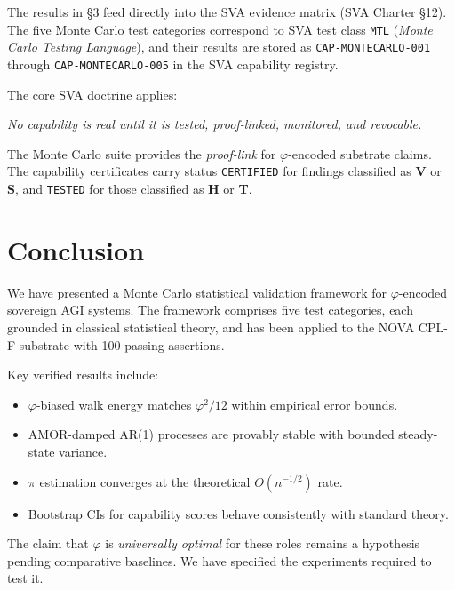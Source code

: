 \documentclass[11pt,a4paper]{article}
\begin{document}
The results in §3 feed directly into the SVA evidence matrix (SVA Charter §12).  The
five Monte Carlo test categories correspond to SVA test class \texttt{MTL}
(\emph{Monte Carlo Testing Language}), and their results are stored as
\texttt{CAP-MONTECARLO-001} through \texttt{CAP-MONTECARLO-005} in the SVA capability
registry.

The core SVA doctrine applies:

\begin{center}
\emph{No capability is real until it is tested, proof-linked, monitored, and revocable.}
\end{center}

The Monte Carlo suite provides the \emph{proof-link} for $\varphi$-encoded substrate
claims.  The capability certificates carry status \texttt{CERTIFIED} for findings
classified as \textbf{V} or \textbf{S}, and \texttt{TESTED} for those classified as
\textbf{H} or \textbf{T}.

\section{Conclusion}
\label{sec:conclusion}

We have presented a Monte Carlo statistical validation framework for $\varphi$-encoded
sovereign AGI systems.  The framework comprises five test categories, each grounded in
classical statistical theory, and has been applied to the NOVA CPL-F substrate with 100
passing assertions.

Key verified results include:
\begin{itemize}
  \item $\varphi$-biased walk energy matches $\varphi^2/12$ within empirical error bounds.
  \item AMOR-damped AR(1) processes are provably stable with bounded steady-state variance.
  \item $\pi$ estimation converges at the theoretical $O(n^{-1/2})$ rate.
  \item Bootstrap CIs for capability scores behave consistently with standard theory.
\end{itemize}

The claim that $\varphi$ is \emph{universally optimal} for these roles remains a
hypothesis pending comparative baselines.  We have specified the experiments required to
test it.
\end{document}

